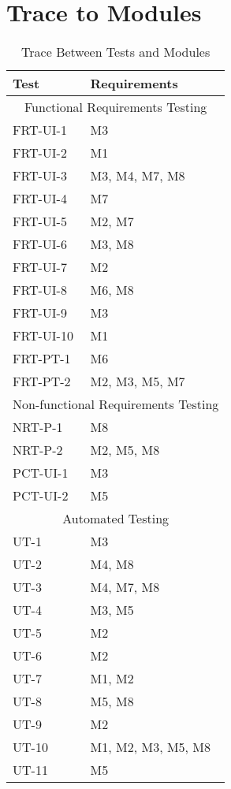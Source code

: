 \documentclass[12pt, titlepage]{article}
\begin{document}
\section{Trace to Modules}		
\begin{table}[H]
			\begin{tabularx}{\textwidth}{XX}
				\toprule
				Test & Requirements \\
				\midrule
				\multicolumn{2}{c}{Functional Requirements Testing} \\
				\midrule
				FRT-UI-1 & M3 \\
				FRT-UI-2 & M1 \\
				FRT-UI-3 & M3, M4, M7, M8 \\
				FRT-UI-4 & M7 \\
				FRT-UI-5 & M2, M7 \\
				FRT-UI-6 & M3, M8 \\
				FRT-UI-7 & M2 \\
				FRT-UI-8 & M6, M8 \\
				FRT-UI-9 & M3 \\
				FRT-UI-10 & M1 \\
				FRT-PT-1 & M6 \\
				FRT-PT-2 & M2, M3, M5, M7 \\
				\midrule
				\multicolumn{2}{c}{Non-functional Requirements Testing} \\
				\midrule
				NRT-P-1 & M8 \\
				NRT-P-2 & M2, M5, M8 \\
				PCT-UI-1 & M3 \\
				PCT-UI-2 & M5 \\
				\midrule
				\multicolumn{2}{c}{Automated Testing} \\
				\midrule
				UT-1 & M3 \\
				UT-2 & M4, M8 \\
				UT-3 & M4, M7, M8 \\
				UT-4 & M3, M5 \\
				UT-5 & M2 \\
				UT-6 & M2 \\
				UT-7 & M1, M2 \\
				UT-8 & M5, M8 \\
				UT-9 & M2 \\
				UT-10 & M1, M2, M3, M5, M8 \\
				UT-11 & M5 \\
				\bottomrule
			\end{tabularx}

			\caption{Trace Between Tests and Modules}
			\label{Table}
		\end{table}
\end{document}
